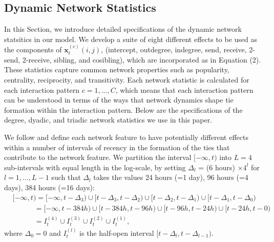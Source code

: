 \documentclass[a4paper]{article}
\begin{document}
\subsection{Dynamic Network Statistics} \label{subsec: Dynamic covariates2}
In this Section, we introduce detailed specifications of the dynamic network statsitics in our model. We develop a suite of eight different effects to be used as the components of $\boldsymbol{x}^{(c)}_t(i, j)$, (intercept, outdegree, indegree, send, receive, 2-send, 2-receive, sibling, and cosibling), which are incorporated as in Equation (2).  These statistics capture common network properties such as popularity, centrality, reciprocity, and transitivity. Each network statistic is calculated for each interaction pattern $c=1,...,C$, which means that each interaction pattern can be understood in terms of the ways that network dynamics shape tie formation within the interaction pattern. Below are the specifications of the degree, dyadic, and triadic network statistics we use in this paper.

We follow \cite{PerryWolfe2012} and define each network feature to have potentially different effects within a number of intervals of recency in the formation of the ties that contribute to the network feature. We partition the interval $[-\infty, t)$ into $L=4$ sub-intervals with equal length in the log-scale, by setting $\Delta_l$ = (6 hours) $\times  4^l$ for $l=1,...,L-1$ such that $\Delta_l$ takes the values 24 hours (=1 day), 96 hours (=4 days), 384 hours (=16 days): 
\begin{equation*}
\begin{aligned}
&[-\infty,t) =[-\infty,t-\Delta_3)\cup [t-\Delta_3, t-\Delta_{2}) \cup [t-\Delta_{2}, t-\Delta_{1})\cup [t-\Delta_1, t-\Delta_{0})\\& \quad\quad\quad= [-\infty,t-384h)\cup [t-384h, t-96h) \cup [t-96h, t-24h)\cup [t-24h, t-0)
\\& \quad\quad\quad=I_t^{(4)}\cup  I_t^{(3)}\cup  I_t^{(2)}\cup I_t^{(1)},
\end{aligned}
\end{equation*}
where $\Delta_0 = 0$ and $I_{t}^{(l)} $ is the half-open interval $[t-\Delta_l, t-\Delta_{l-1})$. 
\end{document}
